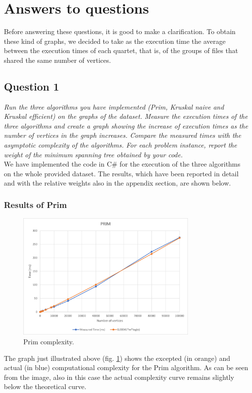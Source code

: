 \section{Answers to questions}

Before answering these questions, it is good to make a clarification. To obtain these kind of graphs, we decided to take as the execution time the average between the execution times of each quartet, that is, of the groups of files that shared the same number of vertices.

\subsection{Question 1}
\textit{Run the three algorithms you have implemented (Prim, Kruskal naive and Kruskal efficient) on the graphs of the dataset. Measure the execution times of the three algorithms and create a graph showing the increase of execution times as the number of vertices in the graph increases. Compare the measured times with the asymptotic complexity of the algorithms. For each problem instance, report the weight of the minimum spanning tree obtained by your code.} \\

\noindent
We have implemented the code in C\# for the execution of the three algorithms on the whole provided dataset. The results, which have been reported in detail and with the relative weights also in the appendix section, are shown below.

\subsubsection{Results of Prim}
\begin{figure}[H]
    \centering
    \includegraphics[width=0.8\textwidth]{../img/Prim.png}
    \caption{Prim complexity.}
    \label{fig:prim}
\end{figure}
The graph just illustrated above (fig. \ref{fig:prim}) shows the excepted (in orange) and actual (in blue) computational complexity for the Prim algorithm. As can be seen from the image, also in this case the actual complexity curve remains slightly below the theoretical curve.


